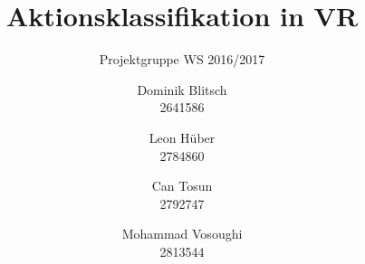 \documentclass[german,11pt]{scrartcl}
\begin{document}
\sloppy

\setcounter{tocdepth}{2}

\title{Aktionsklassifikation in VR}
\subtitle{Projektgruppe WS 2016/2017}
\author{%
Dominik Blitsch\\2641586
\and Leon Hüber\\2784860
\and Can Tosun\\2792747
\and Mohammad Vosoughi\\2813544}

\maketitle







\clearpage
\end{document}
